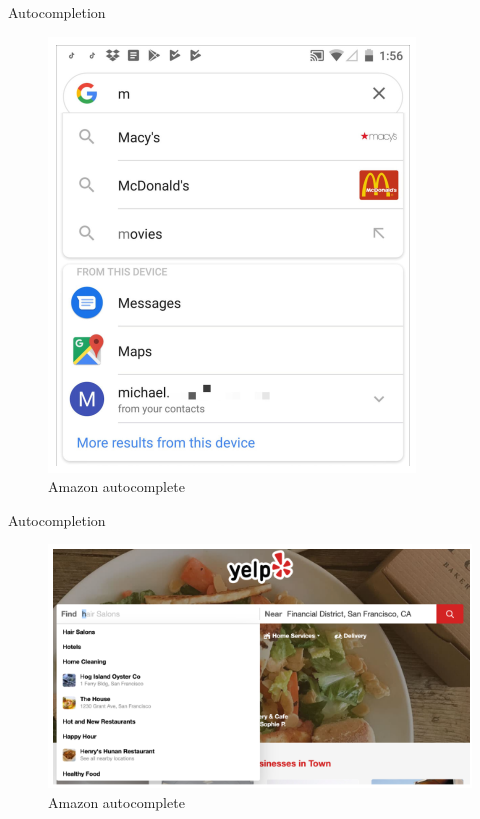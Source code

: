 \documentclass{beamer}
\begin{document}
\begin{frame}[t]{Autocompletion}
	\begin{figure}[h]
		\centering
		\includegraphics[scale=0.6]{images/lec08-pic53.png}
		\caption{Amazon autocomplete}
	\end{figure}
\end{frame}

\begin{frame}[t]{Autocompletion}
	\begin{figure}[h]
		\centering
		\includegraphics[scale=0.6]{images/lec08-pic54.png}
		\caption{Amazon autocomplete}
	\end{figure}
\end{frame}
\end{document}
